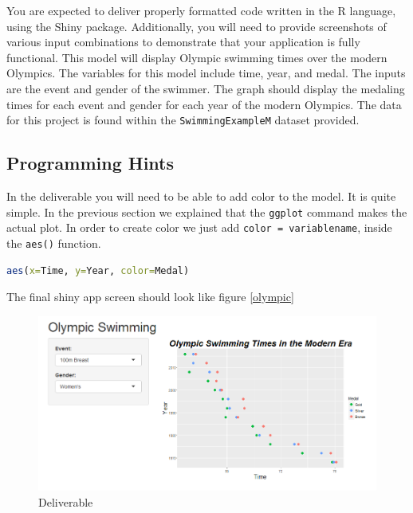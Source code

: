 You are expected to deliver properly formatted code written in the R language, using the Shiny package.
Additionally, you will need to provide screenshots of various input combinations to demonstrate that your application is fully functional.
This model will display Olympic swimming times over the modern Olympics.
The variables for this model include time, year, and medal.
The inputs are the event and gender of the swimmer.
The graph should display the medaling times for each event and gender for each year of the modern Olympics.
The data for this project is found within the \texttt{SwimmingExampleM} dataset provided. 
\subsection{Programming Hints}
In the deliverable you will need to be able to add color to the model.
It is quite simple.
In the previous section we explained that the \texttt{ggplot} command makes the actual plot.
In order to create color we just add \texttt{color = variablename}, inside the \texttt{aes()} function.

\begin{lstlisting}[language = R]
aes(x=Time, y=Year, color=Medal)
\end{lstlisting}
The final shiny app screen should look like figure \ref{olympic}
\begin{figure}[h]
   \centering
   \includegraphics[width = .5\textwidth]{pictures/shiny/olympic.PNG} 
   \caption{Deliverable}
   \label{fig:olympic}
\end{figure}

